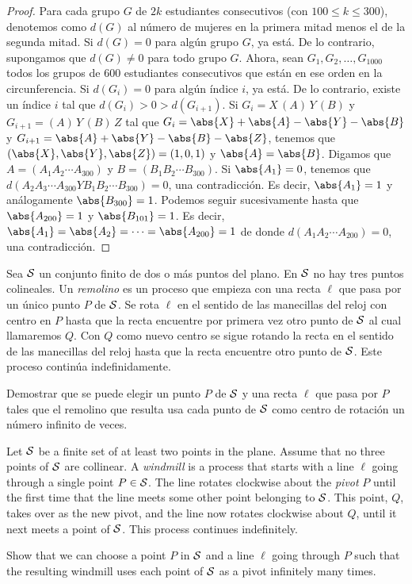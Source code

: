 \begin{proof}
	Para cada grupo $G$ de $2k$ estudiantes consecutivos (con $100\le k\le 300$), denotemos como $d(G)$ al número de mujeres en la primera mitad menos el de la segunda mitad. Si $d(G)=0$ para algún grupo $G$, ya está. De lo contrario, supongamos que $d(G)\ne 0$ para todo grupo $G$. Ahora, sean $G_1,G_2,\dots,G_{1000}$ todos los grupos de $600$ estudiantes consecutivos que están en ese orden en la circunferencia. Si $d(G_i)=0$ para algún índice $i$, ya está. De lo contrario, existe un índice $i$ tal que $d(G_i)>0>d(G_{i+1})$. Si $G_i=X\,(A)\,Y\,(B)$ y $G_{i+1}=(A)\,Y\,(B)\,Z$ tal que $G_i=\abs{X}+\abs{A}-\abs{Y}-\abs{B}$ y $G_{i+1}=\abs{A}+\abs{Y}-\abs{B}-\abs{Z}$, tenemos que $(\abs{X},\abs{Y},\abs{Z})=(1,0,1)$ y $\abs{A}=\abs{B}$. Digamos que $A=(A_1A_2\cdots A_{300})$ y $B=(B_1B_2\cdots B_{300})$. Si $\abs{A_1}=0$, tenemos que $d(A_2A_3\cdots A_{300}YB_1B_2\cdots B_{300})=0$, una contradicción. Es decir, $\abs{A_1}=1$ y análogamente $\abs{B_{300}}=1$. Podemos seguir sucesivamente hasta que $\abs{A_{200}}=1$ y $\abs{B_{101}}=1$. Es decir, $\abs{A_1}=\abs{A_2}=\dots=\abs{A_{200}}=1$ de donde $d(A_1A_2\cdots A_{200})=0$, una contradicción.
\end{proof}

\begin{probMG}[ISL 2011/C3\protect\footnote{IMO 2011/2, como referencia un video de 3Blue1Brown: \url{https://www.youtube.com/watch?v=M64HUIJFTZM}.}]
	Sea $\cal S$ un conjunto finito de dos o más puntos del plano. En $\cal S$ no hay tres puntos colineales. Un \emph{remolino} es un proceso que empieza con una recta $\ell$ que pasa por un único punto $P$ de $\cal S$. Se rota $\ell$ en el sentido de las manecillas del reloj con centro en $P$ hasta que la recta encuentre por primera vez otro punto de $\cal S$ al cual llamaremos $Q$. Con $Q$ como nuevo centro se sigue rotando la recta en el sentido de las manecillas del reloj hasta que la recta encuentre otro punto de $\cal S$. Este proceso continúa indefinidamente.

	Demostrar que se puede elegir un punto $P$ de $\cal S$ y una recta $\ell$ que pasa por $P$ tales que el remolino que resulta usa cada punto de $\cal S$ como centro de rotación un número infinito de veces.
	\begin{hint}
		Let $\cal S$ be a finite set of at least two points in the plane. Assume that no three points of $\cal S$ are collinear. A \emph{windmill} is a process that starts with a line $\ell$ going through a single point $P\in\cal S$. The line rotates clockwise about the \emph{pivot} $P$ until the first time that the line meets some other point belonging to $\cal S$. This point, $Q$, takes over as the new pivot, and the line now rotates clockwise about $Q$, until it next meets a point of $\cal S$. This process continues indefinitely.

		Show that we can choose a point $P$ in $\cal S$ and a line $\ell$ going through $P$ such that the resulting windmill uses each point of $\cal S$ as a pivot infinitely many times.
	\end{hint}
\end{probMG}

